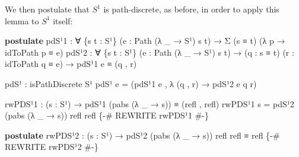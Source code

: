 \documentclass[
  12pt]{article}
\newenvironment{Shaded}{\begin{snugshade}}{\end{snugshade}}
\newcommand{\KeywordTok}[1]{\textcolor[rgb]{0.12,0.11,0.11}{\textbf{#1}}}
\newcommand{\NormalTok}[1]{\textcolor[rgb]{0.12,0.11,0.11}{#1}}
\newcommand{\OtherTok}[1]{\textcolor[rgb]{0.00,0.43,0.16}{#1}}
\newcommand{\PreprocessorTok}[1]{\textcolor[rgb]{0.00,0.43,0.16}{#1}}
\begin{document}
We then postulate that \(S^1\) is path-discrete, as before, in order to
apply this lemma to \(S^1\) itself:

\begin{Shaded}
\begin{Highlighting}[]
\KeywordTok{postulate}
\NormalTok{    pdS¹1 }\OtherTok{:} \OtherTok{∀} \OtherTok{\{}\NormalTok{s t }\OtherTok{:}\NormalTok{ S¹}\OtherTok{\}} \OtherTok{(}\NormalTok{e }\OtherTok{:}\NormalTok{ Path }\OtherTok{(λ} \OtherTok{\_} \OtherTok{→}\NormalTok{ S¹}\OtherTok{)}\NormalTok{ s t}\OtherTok{)}
            \OtherTok{→}\NormalTok{ Σ }\OtherTok{(}\NormalTok{s ≡ t}\OtherTok{)} \OtherTok{(λ}\NormalTok{ p }\OtherTok{→}\NormalTok{ idToPath p ≡ e}\OtherTok{)}
\NormalTok{    pdS¹2 }\OtherTok{:} \OtherTok{∀} \OtherTok{\{}\NormalTok{s t }\OtherTok{:}\NormalTok{ S¹}\OtherTok{\}} \OtherTok{(}\NormalTok{e }\OtherTok{:}\NormalTok{ Path }\OtherTok{(λ} \OtherTok{\_} \OtherTok{→}\NormalTok{ S¹}\OtherTok{)}\NormalTok{ s t}\OtherTok{)}
            \OtherTok{→} \OtherTok{(}\NormalTok{q }\OtherTok{:}\NormalTok{ s ≡ t}\OtherTok{)} \OtherTok{(}\NormalTok{r }\OtherTok{:}\NormalTok{ idToPath q ≡ e}\OtherTok{)}
            \OtherTok{→}\NormalTok{ pdS¹1 e ≡ }\OtherTok{(}\NormalTok{q , r}\OtherTok{)}

\NormalTok{pdS¹ }\OtherTok{:}\NormalTok{ isPathDiscrete S¹}
\NormalTok{pdS¹ e }\OtherTok{=} \OtherTok{(}\NormalTok{pdS¹1 e , }\OtherTok{λ} \OtherTok{(}\NormalTok{q , r}\OtherTok{)} \OtherTok{→}\NormalTok{ pdS¹2 e q r}\OtherTok{)}

\NormalTok{rwPDS¹1 }\OtherTok{:} \OtherTok{(}\NormalTok{s }\OtherTok{:}\NormalTok{ S¹}\OtherTok{)} \OtherTok{→}\NormalTok{ pdS¹1 }\OtherTok{(}\NormalTok{pabs }\OtherTok{(λ} \OtherTok{\_} \OtherTok{→}\NormalTok{ s}\OtherTok{))}\NormalTok{ ≡ }\OtherTok{(}\NormalTok{refl , refl}\OtherTok{)}
\NormalTok{rwPDS¹1 s }\OtherTok{=}\NormalTok{ pdS¹2 }\OtherTok{(}\NormalTok{pabs }\OtherTok{(λ} \OtherTok{\_} \OtherTok{→}\NormalTok{ s}\OtherTok{))}\NormalTok{ refl refl}
\PreprocessorTok{\{{-}\# REWRITE rwPDS¹1 \#{-}\}}

\KeywordTok{postulate}
\NormalTok{    rwPDS¹2 }\OtherTok{:} \OtherTok{(}\NormalTok{s }\OtherTok{:}\NormalTok{ S¹}\OtherTok{)} \OtherTok{→}\NormalTok{ pdS¹2 }\OtherTok{(}\NormalTok{pabs }\OtherTok{(λ} \OtherTok{\_} \OtherTok{→}\NormalTok{ s}\OtherTok{))}\NormalTok{ refl refl ≡ refl}
    \PreprocessorTok{\{{-}\# REWRITE rwPDS¹2 \#{-}\}}
\end{Highlighting}
\end{Shaded}
\end{document}
